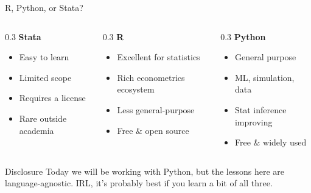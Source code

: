 \documentclass[13pt, aspectratio=169]{beamer}
\begin{document}
\begin{frame}{R, Python, or Stata?}
    \begin{columns}
        \begin{column}{0.3\textwidth}
            \textbf{Stata}
            \begin{itemize}
                \item Easy to learn
                \item Limited scope
                \item Requires a license
                \item Rare outside academia
            \end{itemize}
        \end{column}
        \begin{column}{0.3\textwidth}
            \textbf{R}
            \begin{itemize}
                \item Excellent for statistics
                \item Rich econometrics ecosystem
                \item Less general-purpose
                \item Free \& open source
            \end{itemize}
        \end{column}
        \begin{column}{0.3\textwidth}
            \textbf{Python}
            \begin{itemize}
                \item General purpose
                \item ML, simulation, data
                \item Stat inference improving
                \item Free \& widely used
            \end{itemize}
        \end{column}
    \end{columns}

    \vspace{0.8em}
    \begin{block}{Disclosure}
        Today we will be working with Python, but the lessons here are language-agnostic. IRL, it's probably best if you learn a bit of all three.
    \end{block}
\end{frame}
\end{document}
